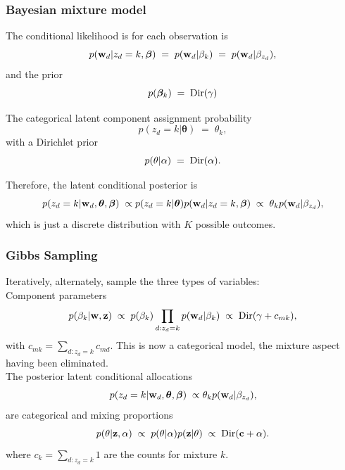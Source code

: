 \begin{frame}
\frametitle{Bayesian mixture model}

The conditional likelihood is for each observation is
\[
p({\bf w}_d|z_d=k,\boldsymbol\beta)\;=\;p({\bf
  w}_d|\beta_k)\;=\;p({\bf w}_d|\beta_{z_d}),
\]
and the prior
\[
p(\boldsymbol\beta_k)\;=\;{\rm Dir}(\gamma)
\]

The categorical latent component assignment probability
\[
p(z_d=k|\boldsymbol\theta)\;=\;\theta_k,
\]
with a Dirichlet prior
\[
p(\theta|\alpha)\;=\;{\rm Dir}(\alpha).
\]

Therefore, the latent conditional posterior is
\[
p(z_d=k|{\bf w}_d,\boldsymbol\theta,\boldsymbol\beta)\;\propto
p(z_d=k|\boldsymbol\theta)p({\bf w}_d|z_d=k,\boldsymbol\beta)\;\propto\;
\theta_k p({\bf w}_d|\beta_{z_d}),
\]
which is just a discrete distribution with $K$ possible outcomes.
\end{frame}


\begin{frame}
\frametitle{Gibbs Sampling}

Iteratively, alternately, sample the three types of variables:\\[1ex]

Component parameters
\[
p(\beta_k|{\bf w},{\bf z})\;\propto\;p(\beta_k)\prod_{d:z_d=k}p({\bf
  w}_d|\beta_k)\;\propto\;{\rm Dir}(\gamma+c_{mk}),
\]
with $c_{mk}=\sum_{d:z_d=k}c_{md}$. This is now a categorical model, the mixture aspect having been eliminated.\\[1ex]

The posterior latent conditional allocations
\[
p(z_d=k|{\bf w}_d,\boldsymbol\theta,\boldsymbol\beta)\;\propto \theta_k
p({\bf w}_d|\beta_{z_d}),
\]
are categorical and mixing proportions
\[
p(\theta|{\bf z},\alpha)\;\propto\;p(\theta|\alpha)p({\bf z}|\theta)\;\propto\;
{\rm Dir}({\bf c}+\alpha).
\]
where $c_k=\sum_{d:z_d=k}1$ are the counts for mixture $k$.
\end{frame}

